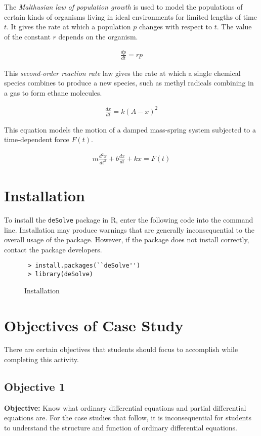 The \textit{Malthusian law of population growth} is used to model the populations of certain kinds of organisms living in ideal environments for limited lengths of time $t$. It gives the rate at which a population $p$ changes with respect to $t$. The value of the constant $r$ depends on the organism.

\begin{gather*}
    \frac{dp}{dt}=rp
\end{gather*}

This \textit{second-order reaction rate} law gives the rate at which a single chemical species combines to produce a new species, such as methyl radicals combining in a gas to form ethane molecules.

\begin{gather*}
    \frac{dx}{dt}=k(A-x)^2
\end{gather*}

This equation models the motion of a damped mass-spring system subjected to a time-dependent force $F(t)$.

\begin{gather*}
    m\frac{d^2 x}{dt^2}+b\frac{dx}{dt}+kx=F(t)
\end{gather*}

\section{Installation}

To install the \texttt{deSolve} package in R, enter the following code into the command line. Installation may produce warnings that are generally inconsequential to the overall usage of the package. However, if the package does not install correctly, contact the package developers.

\begin{figure}[H]
\centering
\caption{Installation}
\begin{lstlisting}
 > install.packages(``deSolve'')
 > library(deSolve)
\end{lstlisting}
\end{figure}

\section{Objectives of Case Study}

There are certain objectives that students should focus to accomplish while completing this activity. 

\subsection{Objective 1}
\textbf{Objective: } Know what ordinary differential equations and partial differential equations are. For the case studies that follow, it is inconsequential for students to understand the structure and function of ordinary differential equations.

